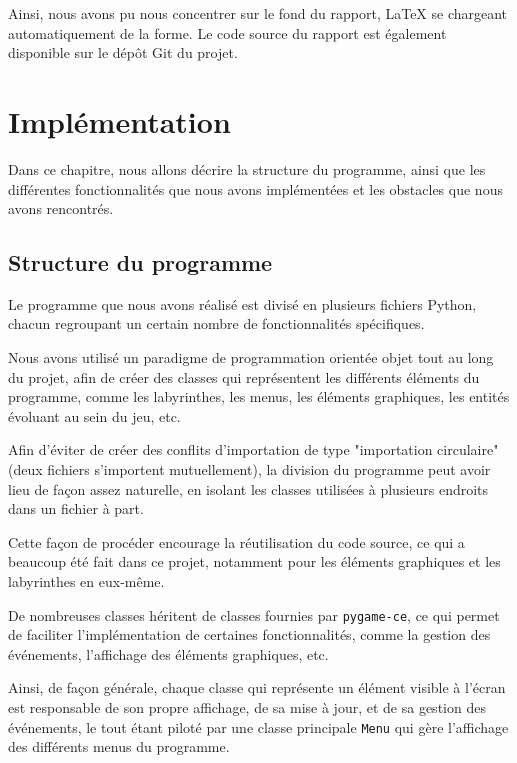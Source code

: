 \documentclass[12pt]{scrreprt} %
\begin{document}
Ainsi, nous avons pu nous concentrer sur le fond du rapport, LaTeX se chargeant automatiquement de la forme. Le code source du rapport est également disponible sur le dépôt Git du projet.

\chapter{Implémentation}


Dans ce chapitre, nous allons décrire la structure du programme, ainsi que les différentes fonctionnalités que nous avons implémentées et les obstacles que nous avons rencontrés.

\section{Structure du programme}

Le programme que nous avons réalisé est divisé en plusieurs fichiers Python, chacun regroupant un certain nombre de fonctionnalités spécifiques.

Nous avons utilisé un paradigme de programmation orientée objet tout au long du projet, afin de créer des classes qui représentent les différents éléments du programme, comme les labyrinthes, les menus, les éléments graphiques, les entités évoluant au sein du jeu, etc.

Afin d'éviter de créer des conflits d'importation de type "importation circulaire" (deux fichiers s'importent mutuellement), la division du programme peut avoir lieu de façon assez naturelle, en isolant les classes utilisées à plusieurs endroits dans un fichier à part.

Cette façon de procéder encourage la réutilisation du code source, ce qui a beaucoup été fait dans ce projet, notamment pour les éléments graphiques et les labyrinthes en eux-même.

De nombreuses classes héritent de classes fournies par \texttt{pygame-ce}, ce qui permet de faciliter l'implémentation de certaines fonctionnalités, comme la gestion des événements, l'affichage des éléments graphiques, etc.

Ainsi, de façon générale, chaque classe qui représente un élément visible à l'écran est responsable de son propre affichage, de sa mise à jour, et de sa gestion des événements, le tout étant piloté par une classe principale \texttt{Menu} qui gère l'affichage des différents menus du programme.
\end{document}
